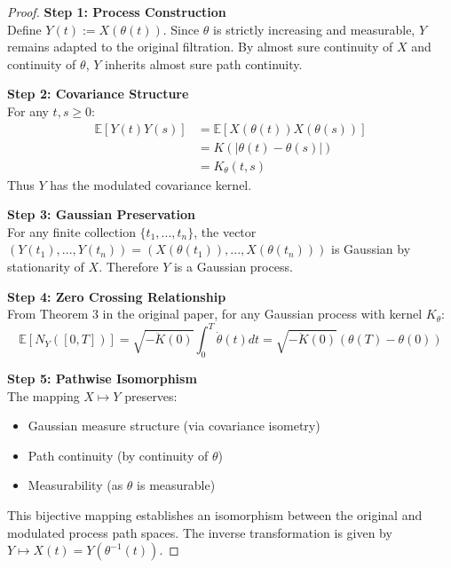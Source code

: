 \documentclass{mc}
\begin{document}
\begin{proof}
\textbf{Step 1: Process Construction} \\
Define $Y(t) := X(\theta(t))$. Since $\theta$ is strictly increasing and measurable, $Y$ remains adapted to the original filtration. By almost sure continuity of $X$ and continuity of $\theta$, $Y$ inherits almost sure path continuity.

\textbf{Step 2: Covariance Structure} \\
For any $t,s \geq 0$:
\begin{equation}
\begin{aligned}
\mathbb{E}[Y(t)Y(s)] &= \mathbb{E}[X(\theta(t))X(\theta(s))] \\
&= K(|\theta(t)-\theta(s)|) \\
&= K_\theta(t,s)
\end{aligned}
\end{equation}
Thus $Y$ has the modulated covariance kernel.

\textbf{Step 3: Gaussian Preservation} \\
For any finite collection $\{t_1,...,t_n\}$, the vector $(Y(t_1),...,Y(t_n)) = (X(\theta(t_1)),...,X(\theta(t_n)))$ is Gaussian by stationarity of $X$. Therefore $Y$ is a Gaussian process.

\textbf{Step 4: Zero Crossing Relationship} \\
From Theorem 3 in the original paper, for any Gaussian process with kernel $K_\theta$:
\begin{equation}
\mathbb{E}[N_Y([0,T])] = \sqrt{-\ddot{K}(0)}\int_0^T \dot{\theta}(t)dt = \sqrt{-\ddot{K}(0)}(\theta(T)-\theta(0))
\end{equation}

\textbf{Step 5: Pathwise Isomorphism} \\
The mapping $X \mapsto Y$ preserves:
\begin{itemize}
\item Gaussian measure structure (via covariance isometry)
\item Path continuity (by continuity of $\theta$)
\item Measurability (as $\theta$ is measurable)
\end{itemize}

This bijective mapping establishes an isomorphism between the original and modulated process path spaces. The inverse transformation is given by $Y \mapsto X(t) = Y(\theta^{-1}(t))$.
\end{proof}
\end{document}
